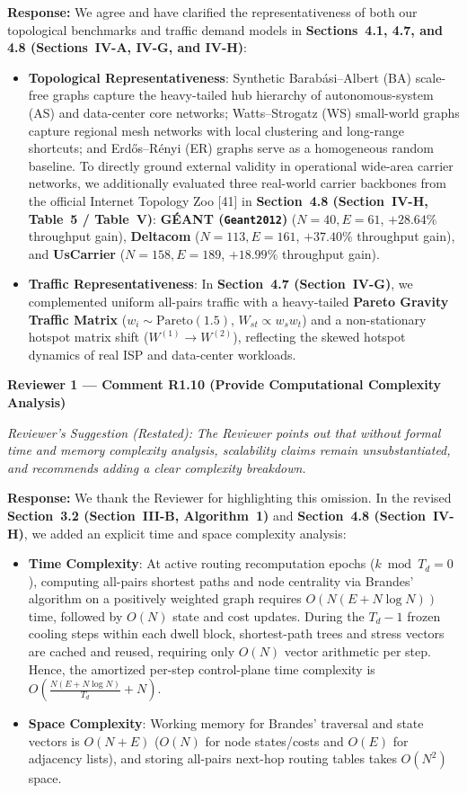 \documentclass[11pt,a4paper]{article}
\newcommand{\cbox}[2]{%
  \vspace{0.6em}\noindent\textbf{#1}\par\smallskip
  \noindent\textit{Reviewer's Suggestion (Restated):} \textit{#2}\par\smallskip
}
\begin{document}
\noindent\textbf{Response:} We agree and have clarified the representativeness of both our topological benchmarks and traffic demand models in \textbf{Sections~4.1, 4.7, and 4.8 (Sections~IV-A, IV-G, and IV-H)}:
\begin{itemize}[leftmargin=1.8em]
    \item \textbf{Topological Representativeness}: Synthetic Barab\'{a}si--Albert (BA) scale-free graphs capture the heavy-tailed hub hierarchy of autonomous-system (AS) and data-center core networks; Watts--Strogatz (WS) small-world graphs capture regional mesh networks with local clustering and long-range shortcuts; and Erd\H{o}s--R\'{e}nyi (ER) graphs serve as a homogeneous random baseline. To directly ground external validity in operational wide-area carrier networks, we additionally evaluated three real-world carrier backbones from the official Internet Topology Zoo [41] in \textbf{Section~4.8 (Section~IV-H, Table~5 / Table~V)}: \textbf{G\'EANT (\texttt{Geant2012})} ($N=40, E=61$, $+28.64\%$ throughput gain), \textbf{Deltacom} ($N=113, E=161$, $+37.40\%$ throughput gain), and \textbf{UsCarrier} ($N=158, E=189$, $+18.99\%$ throughput gain).
    \item \textbf{Traffic Representativeness}: In \textbf{Section~4.7 (Section~IV-G)}, we complemented uniform all-pairs traffic with a heavy-tailed \textbf{Pareto Gravity Traffic Matrix} ($w_i \sim \mathrm{Pareto}(1.5)$, $W_{st} \propto w_s w_t$) and a non-stationary hotspot matrix shift ($W^{(1)} \to W^{(2)}$), reflecting the skewed hotspot dynamics of real ISP and data-center workloads.
\end{itemize}

\hrulefill

\cbox{Reviewer 1 --- Comment R1.10 (Provide Computational Complexity Analysis)}{The Reviewer points out that without formal time and memory complexity analysis, scalability claims remain unsubstantiated, and recommends adding a clear complexity breakdown.}

\noindent\textbf{Response:} We thank the Reviewer for highlighting this omission. In the revised \textbf{Section~3.2 (Section~III-B, Algorithm~1)} and \textbf{Section~4.8 (Section~IV-H)}, we added an explicit time and space complexity analysis:
\begin{itemize}[leftmargin=1.8em]
    \item \textbf{Time Complexity}: At active routing recomputation epochs ($k \bmod T_d = 0$), computing all-pairs shortest paths and node centrality via Brandes' algorithm on a positively weighted graph requires $O(N(E + N\log N))$ time, followed by $O(N)$ state and cost updates. During the $T_d - 1$ frozen cooling steps within each dwell block, shortest-path trees and stress vectors are cached and reused, requiring only $O(N)$ vector arithmetic per step. Hence, the amortized per-step control-plane time complexity is $O\!\left(\frac{N(E + N\log N)}{T_d} + N\right)$.
    \item \textbf{Space Complexity}: Working memory for Brandes' traversal and state vectors is $O(N + E)$ ($O(N)$ for node states/costs and $O(E)$ for adjacency lists), and storing all-pairs next-hop routing tables takes $O(N^2)$ space.
\end{itemize}
\end{document}
